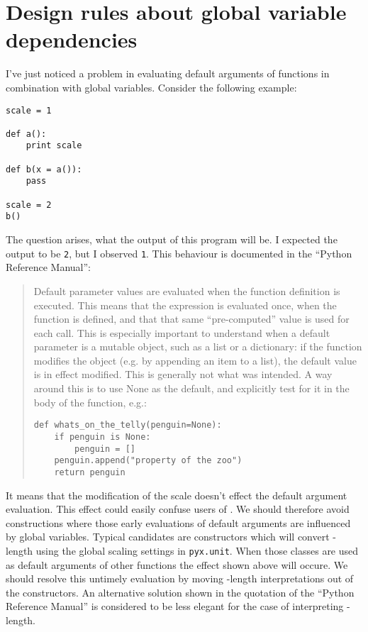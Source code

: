 \documentclass{article}
\begin{document}
\section*{Design rules about global variable dependencies}

I've just noticed a problem in evaluating default arguments of
functions in combination with global variables. Consider the following
example:

\begin{verbatim}
scale = 1

def a():
    print scale

def b(x = a()):
    pass

scale = 2
b()
\end{verbatim}

The question arises, what the output of this program will be. I
expected the output to be \verb|2|, but I observed \verb|1|. This
behaviour is documented in the ``Python Reference Manual'':

\begin{quote}
Default parameter values are evaluated when the function definition is
executed. This means that the expression is evaluated once, when the
function is defined, and that that same ``pre-computed'' value is used
for each call. This is especially important to understand when a
default parameter is a mutable object, such as a list or a dictionary:
if the function modifies the object (e.g. by appending an item to a
list), the default value is in effect modified. This is generally not
what was intended. A way around this is to use None as the default,
and explicitly test for it in the body of the function, e.g.:
\begin{verbatim}
def whats_on_the_telly(penguin=None):
    if penguin is None:
        penguin = []
    penguin.append("property of the zoo")
    return penguin
\end{verbatim}
\end{quote}

It means that the modification of the scale doesn't effect the default
argument evaluation. This effect could easily confuse users of \PyX.
We should therefore avoid constructions where those early evaluations
of default arguments are influenced by global variables. Typical
candidates are constructors which will convert \PyX-length using the
global scaling settings in \verb|pyx.unit|. When those classes are
used as default arguments of other functions the effect shown above
will occure. We should resolve this untimely evaluation by moving
\PyX-length interpretations out of the constructors. An alternative
solution shown in the quotation of the ``Python Reference Manual'' is
considered to be less elegant for the case of interpreting
\PyX-length.
\end{document}
